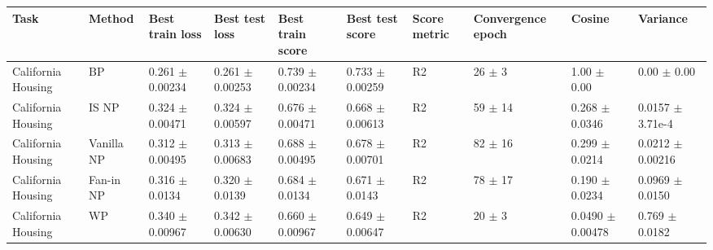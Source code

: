 \begin{tabular}{llllllllll}
\toprule
Task & Method & Best train loss & Best test loss & Best train score & Best test score & Score metric & Convergence epoch & Cosine & Variance \\
\midrule
California Housing & BP & 0.261 $\pm$ 0.00234 & 0.261 $\pm$ 0.00253 & 0.739 $\pm$ 0.00234 & 0.733 $\pm$ 0.00259 & R2 & 26 $\pm$ 3 & 1.00 $\pm$ 0.00 & 0.00 $\pm$ 0.00 \\
California Housing & IS NP & 0.324 $\pm$ 0.00471 & 0.324 $\pm$ 0.00597 & 0.676 $\pm$ 0.00471 & 0.668 $\pm$ 0.00613 & R2 & 59 $\pm$ 14 & 0.268 $\pm$ 0.0346 & 0.0157 $\pm$ 3.71e-4 \\
California Housing & Vanilla NP & 0.312 $\pm$ 0.00495 & 0.313 $\pm$ 0.00683 & 0.688 $\pm$ 0.00495 & 0.678 $\pm$ 0.00701 & R2 & 82 $\pm$ 16 & 0.299 $\pm$ 0.0214 & 0.0212 $\pm$ 0.00216 \\
California Housing & Fan-in NP & 0.316 $\pm$ 0.0134 & 0.320 $\pm$ 0.0139 & 0.684 $\pm$ 0.0134 & 0.671 $\pm$ 0.0143 & R2 & 78 $\pm$ 17 & 0.190 $\pm$ 0.0234 & 0.0969 $\pm$ 0.0150 \\
California Housing & WP & 0.340 $\pm$ 0.00967 & 0.342 $\pm$ 0.00630 & 0.660 $\pm$ 0.00967 & 0.649 $\pm$ 0.00647 & R2 & 20 $\pm$ 3 & 0.0490 $\pm$ 0.00478 & 0.769 $\pm$ 0.0182 \\
\bottomrule
\end{tabular}
